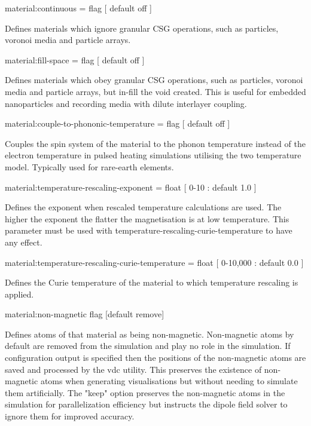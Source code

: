 {\zicf material:continuous = flag [ default off ]} Defines materials which ignore granular CSG operations, such as particles, voronoi media and particle arrays.

{\zicf material:fill-space = flag [ default off ]} Defines materials which obey granular CSG operations, such as particles, voronoi media and particle arrays, but in-fill the void created. This is useful for embedded nanoparticles and recording media with dilute interlayer coupling.

{\zicf material:couple-to-phononic-temperature = flag [ default off ]} Couples the spin system of the material to the phonon temperature instead of the electron temperature in pulsed heating simulations utilising the two temperature model. Typically used for rare-earth elements.

{\zicf material:temperature-rescaling-exponent = float [ 0-10 : default 1.0 ]} Defines the exponent when rescaled temperature calculations are used. The higher the exponent the flatter the magnetisation is at low temperature. This parameter must be used with temperature-rescaling-curie-temperature to have any effect.

{\zicf material:temperature-rescaling-curie-temperature = float [ 0-10,000 : default 0.0 ]} Defines the Curie temperature of the material to which temperature rescaling is applied.

{\zicf material:non-magnetic flag [default remove]} Defines atoms of
that material as being non-magnetic. Non-magnetic atoms by default are removed from the simulation and play no role in the simulation. If configuration output is specified then the positions of the non-magnetic atoms are saved and processed by the vdc utility. This preserves the existence of non-magnetic atoms when generating visualisations but without needing to simulate them artificially. The "keep" option preserves the non-magnetic atoms in the simulation for parallelization efficiency but instructs the dipole field solver to ignore them for improved accuracy.



